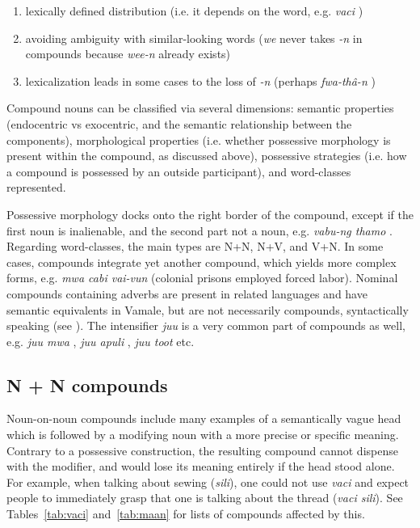 \begin{enumerate}
	\sloppy
	\item lexically defined distribution (i.e. it depends on the word, e.g. \textit{vaci} )
	\item avoiding ambiguity with similar-looking words (\textit{we}  never takes \textit{-n} in compounds because \textit{wee-n}  already exists)
	\item lexicalization leads in some cases to the loss of \textit{-n} (perhaps \textit{fwa-thâ-n} )
\end{enumerate}

Compound nouns can be classified via several dimensions: semantic properties (endocentric vs exocentric, and the semantic relationship between the components), morphological properties (i.e. whether possessive morphology is present within the compound, as discussed above), possessive strategies (i.e. how a compound is possessed by an outside participant), and word-classes represented. 

Possessive morphology docks onto the right border of the compound, except if the first noun is inalienable, and the second part not a noun, e.g. \textit{vabu-ng thamo}  . Regarding word-classes, the main types are N+N, N+V, and V+N. In some cases, compounds integrate yet another compound, which yields more complex forms, e.g. \textit{{\ob}mwa{\cb} {\ob}cabi {\ob}vai-vun{\cb\cb}}   (colonial prisons employed forced labor). Nominal compounds containing adverbs are present in related languages \parencite[200]{bril_noms_2004} and have semantic equivalents in Vamale, but are not necessarily compounds, syntactically speaking (see ). The intensifier \textit{juu}  is a very common part of compounds as well, e.g. \textit{juu mwa} , \textit{juu apuli} , \textit{juu toot}  etc.

\subsection{N + N compounds}
Noun-on-noun compounds include many examples of a semantically vague head which is followed by a modifying noun with a more precise or specific meaning. Contrary to a possessive construction, the resulting compound cannot dispense with the modifier, and would lose its meaning entirely if the head stood alone. For example, when talking about sewing (\textit{sili}), one could not use \textit{vaci}  and expect people to immediately grasp that one is talking about the thread (\textit{vaci sili}). See Tables~\ref{tab:vaci} and~\ref{tab:maan} for lists of compounds affected by this. 

